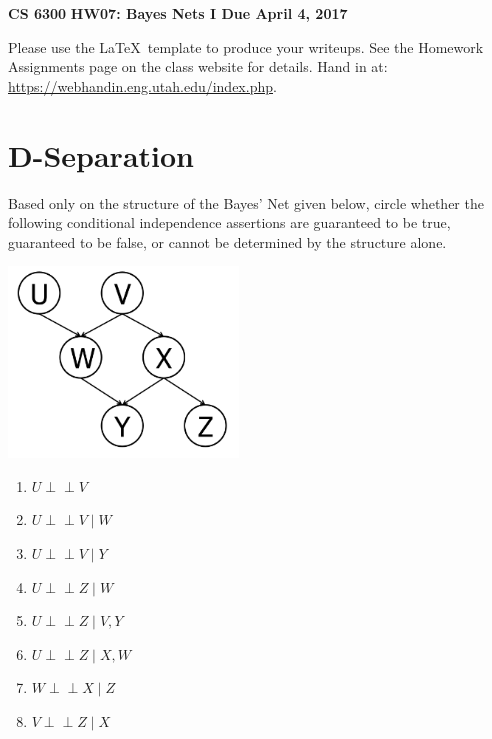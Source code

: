 \documentclass[12pt]{article}
\newcommand{\indep}{\perp\!\!\!\perp}
\begin{document}
\begin{center}
{\bf CS 6300} \hfill {\large\bf HW07: Bayes Nets I \hfill Due April 4, 2017}
\end{center}

\noindent
Please use the \LaTeX\ template to produce your writeups. See the
Homework Assignments page on the class website for details.  Hand in
at: \url{https://webhandin.eng.utah.edu/index.php}.

\section{D-Separation}
 
Based only on the structure of the Bayes' Net given below,
circle whether the following conditional independence assertions are
guaranteed to be true, guaranteed to be false, or cannot be determined
by the structure alone.

\begin{center}
\includegraphics[height=2in]{prob1.png}
\end{center}

\begin{enumerate}

\item $U \indep V$

\item $U \indep V \mid W$

\item $U \indep V \mid Y$

\item $U \indep Z \mid W$

\item $U \indep Z \mid V, Y$

\item $U \indep Z \mid X, W$

\item $W \indep X \mid Z$

\item $V \indep Z \mid X$

\end{enumerate}
\end{document}

